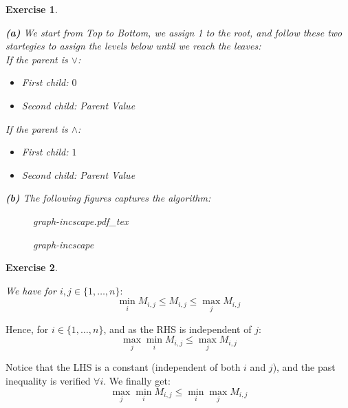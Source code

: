 \documentclass{article}
\newcommand{\incfig}[1]{%
    \def\svgwidth{\columnwidth}
    {#1.pdf_tex}
}
\newtheorem{exo}{Exercise}
\begin{document}
\newpage
\begin{exo}{\ \\}

\textbf{(a)}
We start from Top to Bottom, we assign 1 to the root, and follow these two startegies  to assign the levels below until we reach the leaves:\\

If the parent is $\lor$:
\begin{itemize}
    \item First child: $0$
    \item Second child: Parent Value
\end{itemize}

If the parent is $\land$:
\begin{itemize}
    \item First child: $1$
    \item Second child: Parent Value
\end{itemize}

\textbf{(b)} The following figures captures the algorithm:
 
\begin{figure}[ht]
    \centering
    \incfig{graph-incscape}
    \caption{graph-incscape}
    \label{fig:graph-incscape}
\end{figure}


\end{exo}

\begin{exo}{\ \\}


We have for $i,j \in \{1, \dots, n\}\colon$ \[ \min_{i} M_{i,j} \leq M_{i,j} \le \max_{j} M_{i,j}   \]
\end{exo}

Hence, for $i \in \{1, \dots, n\}$, and as the RHS is independent of $j\colon$ \[ \max_{j} \min_{i} M_{i,j} \le \max_{j} M_{i,j} \]

Notice that the LHS is a constant (independent of both $i$ and $j$), and the past inequality is verified $\forall i$. We finally get: \[ \max_{j} \min_{i} M_{i,j} \le  \min_{i} \max_{j} M_{i,j}  \]
\end{document}
